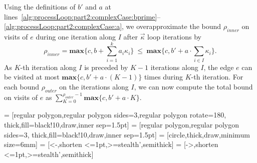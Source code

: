 \documentclass[10pt,a4paper]{article}
\newcommand{\maxim}{\ensuremath{\mathbf{max}}}
\begin{document}
Using the definitions of $b'$ and $a$ at
lines~\ref{alg:processLoop:part2:complexCase:bprime}--\ref{alg:processLoop:part2:complexCase:a},
we overapproximate the bound $\rho_\mathit{inner}$ on visits of $e$ during
one iteration along $I$ after $\vec{\kappa}$ loop iterations by
$$\rho_\mathit{inner}=\maxim\{c,b+\sum_{i=1}^{k}a_i\kappa_i\}
~\le~\maxim\{c,b'+a\cdot\sum_{i\in I}\kappa_i\}.$$ As $K$-th iteration along
$I$ is preceded by $K-1$ iterations along $I$, the edge $e$ can be visited
at most $\maxim\{c,b'+a\cdot (K-1)\}$ times during $K$-th iteration. For each
bound $\rho_\mathit{outer}$ on the iterations along $I$, we can now compute
the total bound on visits of $e$ as
$\sum_{K=0}^{\rho_{\mathit{outer}}-1}\maxim\{c, b' + a \cdot K\}$.
 
\begin{figure*}[!t]
\centering
{} = [regular polygon,regular polygon sides=3,regular polygon rotate=180,
  thick,fill=black!10,draw,inner sep=1.5pt]
 = [regular polygon,regular polygon sides=3,
  thick,fill=black!10,draw,inner sep=1.5pt]
 = [circle,thick,draw,minimum size=6mm]
 = [<-,shorten <=1pt,>=stealth',semithick]
 = [->,shorten <=1pt,>=stealth',semithick]


\end{figure*}
\end{document}
